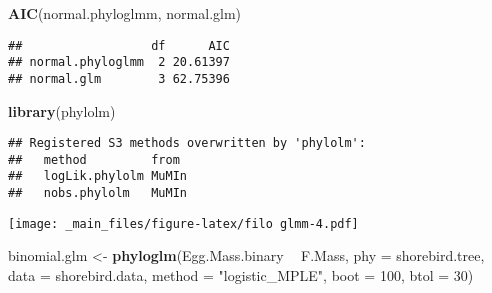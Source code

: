 \documentclass[
]{book}
\newenvironment{Shaded}{\begin{snugshade}}{\end{snugshade}}
\newcommand{\DataTypeTok}[1]{\textcolor[rgb]{0.13,0.29,0.53}{#1}}
\newcommand{\DecValTok}[1]{\textcolor[rgb]{0.00,0.00,0.81}{#1}}
\newcommand{\KeywordTok}[1]{\textcolor[rgb]{0.13,0.29,0.53}{\textbf{#1}}}
\newcommand{\NormalTok}[1]{#1}
\newcommand{\OperatorTok}[1]{\textcolor[rgb]{0.81,0.36,0.00}{\textbf{#1}}}
\newcommand{\StringTok}[1]{\textcolor[rgb]{0.31,0.60,0.02}{#1}}
\begin{document}
\begin{Shaded}
\begin{Highlighting}[]
\KeywordTok{AIC}\NormalTok{(normal.phyloglmm, normal.glm)}
\end{Highlighting}
\end{Shaded}

\begin{verbatim}
##                  df      AIC
## normal.phyloglmm  2 20.61397
## normal.glm        3 62.75396
\end{verbatim}

\begin{Shaded}
\begin{Highlighting}[]
\KeywordTok{library}\NormalTok{(phylolm)}
\end{Highlighting}
\end{Shaded}

\begin{verbatim}
## Registered S3 methods overwritten by 'phylolm':
##   method         from 
##   logLik.phylolm MuMIn
##   nobs.phylolm   MuMIn
\end{verbatim}

\begin{Shaded}
\end{Shaded}

\texttt{[image: \_main\_files/figure-latex/filo glmm-4.pdf]}

\begin{Shaded}
\begin{Highlighting}[]
\NormalTok{binomial.glm <-}\StringTok{ }\KeywordTok{phyloglm}\NormalTok{(Egg.Mass.binary }\OperatorTok{~}\StringTok{ }\NormalTok{F.Mass, }\DataTypeTok{phy =}\NormalTok{ shorebird.tree, }\DataTypeTok{data =}\NormalTok{ shorebird.data, }\DataTypeTok{method =} \StringTok{"logistic_MPLE"}\NormalTok{, }\DataTypeTok{boot =} \DecValTok{100}\NormalTok{, }\DataTypeTok{btol =} \DecValTok{30}\NormalTok{)}
\end{Highlighting}
\end{Shaded}
\end{document}
